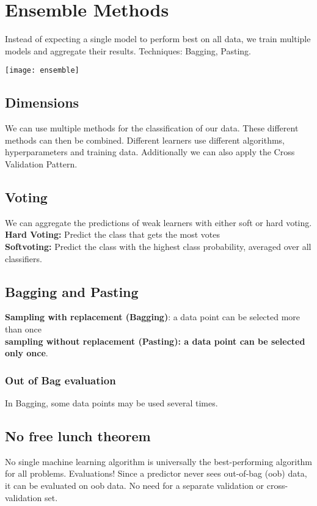 \section{Ensemble Methods}
\begin{minipage}{0,5\linewidth}
	Instead of expecting a single model to perform best on all data, we train multiple models and aggregate their results. Techniques: Bagging, Pasting. 
\end{minipage}
\begin{minipage}{0,5\linewidth}
	\texttt{[image: ensemble]}  
\end{minipage}

\subsection{Dimensions}
We can use multiple methods for the classification of our data. These different methods can then be combined. Different learners use different algorithms, hyperparameters and training data. Additionally we can also apply the Cross Validation Pattern.

\subsection{Voting}
We can aggregate the predictions of weak learners with either soft or hard voting.\\
\textbf{Hard Voting:} Predict the class that gets the most votes\\
\textbf{Softvoting:} Predict the class with the highest class probability, averaged over all classifiers.
 
\subsection{Bagging and Pasting}
\textbf{Sampling with replacement (Bagging)}: a data point can be selected more than once\\
\textbf{sampling without replacement (Pasting): a data point can be selected only once}.

\subsubsection{Out of Bag evaluation}
 In Bagging, some data points may be used several times. 

\subsection{No free lunch theorem}
No single machine learning algorithm is universally the best-performing algorithm for all problems. Evaluations! Since a predictor never sees out-of-bag (oob) data, it can be evaluated on oob data. No need for a separate validation or cross-validation set.